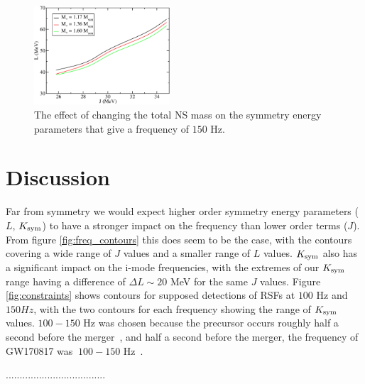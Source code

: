 \documentclass[fleqn,usenatbib]{mnras}
\begin{document}
\begin{figure}
\centering
\includegraphics[width=0.45\textwidth,angle=0]{K40_f150_Mcomp.pdf}
\caption{The effect of changing the total NS mass on the symmetry energy parameters that give a frequency of $150$ Hz.}
\label{fig:vary_mass_contours}
\end{figure}








\section{Discussion}
\hspace{\parindent}Far from symmetry we would expect higher order symmetry energy parameters ($L$, $K_{\rm sym}$) to have a stronger impact on the frequency than lower order terms ($J$). From figure \ref{fig:freq_contours} this does seem to be the case, with the contours covering a wide range of $J$ values and a smaller range of $L$ values. $K_{\rm sym}$ also has a significant impact on the i-mode frequencies, with the extremes of our $K_{\rm sym}$ range having a difference of $\Delta L\sim 20$ MeV for the same $J$ values. Figure \ref{fig:constraints} shows contours for supposed detections of RSFs at $100$ Hz and $150 Hz$, with the two contours for each frequency showing the range of $K_{\rm sym}$ values. $100-150$ Hz was chosen because the precursor occurs roughly half a second before the merger~\cite{zhong2019precursors}, and half a second before the merger, the frequency of GW170817 was $~100-150$ Hz~\cite{abbott2017merger}.

\hspace{\parindent}....................................
\end{document}
